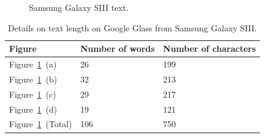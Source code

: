 	\begin{figure}[H]%
		\centering
   		 \qquad
   		 \qquad
   		 \qquad
   		 \qquad
		\caption{Samsung Galaxy SIII text.}
		\label{glassTestTextLengthS3Text}
	\end{figure}

	\begin{table}[ht!]
    		\caption{Details on text length on Google Glass from Samsung Galaxy SIII.} \label{tab:glassTestTextLengthS3TextTable}
		\centering \begin{tabularx}{\textwidth}{l|X|X} \hline
		\textbf{Figure} & \textbf{Number of words} & \textbf{Number of characters} \\ \hline \hline
       
		Figure~\ref{glassTestTextLengthS3Text}~(a)	&26	&199	\\ \hline
		Figure~\ref{glassTestTextLengthS3Text}~(b)	&32	&213	\\ \hline
		Figure~\ref{glassTestTextLengthS3Text}~(c)	&29	&217	\\ \hline
		Figure~\ref{glassTestTextLengthS3Text}~(d)	&19	&121	\\ \hline
		Figure~\ref{glassTestTextLengthS3Text}~(Total)	&106	&750	\\ \hline
		
		\end{tabularx}
	\end{table}

